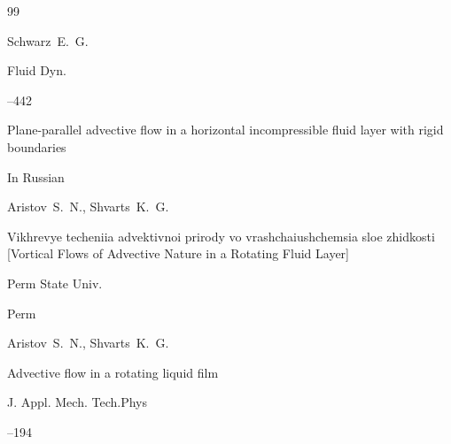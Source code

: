 \begin{thebibliography}{99}














\by Schwarz~E.~G. 


\jour Fluid Dyn.




–442 

\paper Plane-parallel advective flow in a horizontal incompressible fluid layer with rigid boundaries






\lang In Russian

\by Aristov~S.~N., Shvarts~K.~G.

\book Vikhrevye techeniia advektivnoi prirody vo vrashchaiushchemsia sloe zhidkosti \rm [Vortical Flows of Advective Nature in a Rotating Fluid Layer]


\publ Perm State Univ.

\publaddr Perm







\by Aristov~S.~N., Shvarts~K.~G.

\paper Advective flow in a rotating liquid film

\jour J. Appl. Mech. Tech.Phys




--194


\end{thebibliography}
